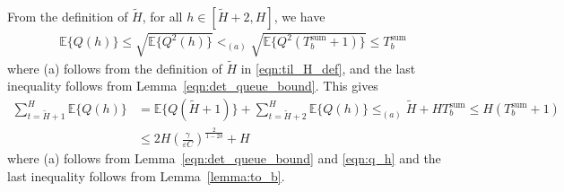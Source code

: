 \documentclass[12pt,draftcls, onecolumn]{IEEEtran}
\begin{document}
From the definition of $\tilde{H}$, for all $h \in [\tilde{H}+2,H]$,  we have
\begin{align}\label{eqn:q_h}
    \mathbb{E}\{Q(h)\} \leq \sqrt{\mathbb{E}\{Q^2(h)\}} <_{(a)} \sqrt{\mathbb{E}\{Q^2(T^{\text{sum}}_b+1)\}} \leq T^{\text{sum}}_b
\end{align}
where (a) follows from the definition of $\tilde{H}$ in \eqref{eqn:til_H_def}, and the last inequality follows from Lemma~\ref{eqn:det_queue_bound}. This gives
\begin{align}\label{eqn:mp_eq}
    \sum_{t=\tilde{H}+1}^H \mathbb{E}\{Q(h)\} &=  \mathbb{E}\{Q(\tilde{H}+1)\}+\sum_{t=\tilde{H}+2}^H \mathbb{E}\{Q(h)\}  \leq_{(a)} \tilde{H}+HT^{\text{sum}}_b \leq H(T^{\text{sum}}_b+1) \nonumber\\&\leq 2H\left(\frac{\gamma}{\varepsilon C}\right)^{\frac{2}{1-2\delta}} +H
\end{align}
where (a) follows from Lemma~\ref{eqn:det_queue_bound} and \eqref{eqn:q_h} and the last inequality follows from Lemma~\ref{lemma:to_b}.
\end{document}
